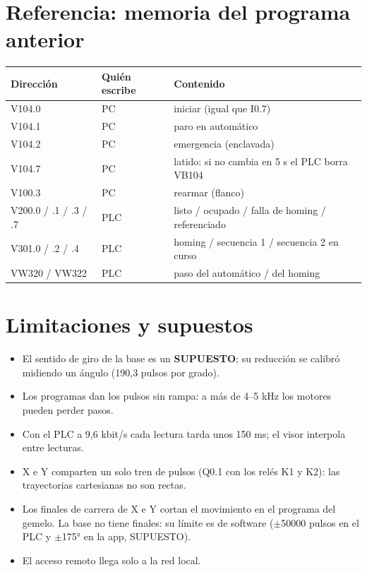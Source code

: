 \documentclass[a4paper,11pt]{article}
\begin{document}
\section{Referencia: memoria del programa anterior}
\begin{center}\small
\begin{tabular}{@{}lll@{}}
\toprule
\textbf{Dirección} & \textbf{Quién escribe} & \textbf{Contenido}\\
\midrule
V104.0 & PC & iniciar (igual que I0.7)\\
V104.1 & PC & paro en automático\\
V104.2 & PC & emergencia (enclavada)\\
V104.7 & PC & latido: si no cambia en 5 s el PLC borra VB104\\
V100.3 & PC & rearmar (flanco)\\
V200.0 / .1 / .3 / .7 & PLC & listo / ocupado / falla de homing / referenciado\\
V301.0 / .2 / .4 & PLC & homing / secuencia 1 / secuencia 2 en curso\\
VW320 / VW322 & PLC & paso del automático / del homing\\
\bottomrule
\end{tabular}
\end{center}

\section{Limitaciones y supuestos}
\begin{itemize}
\item El sentido de giro de la base es un \textbf{SUPUESTO}; su reducción se calibró midiendo un ángulo (190,3 pulsos por grado).
\item Los programas dan los pulsos sin rampa: a más de 4--5 kHz los motores pueden perder pasos.
\item Con el PLC a 9,6 kbit/s cada lectura tarda unos 150 ms; el visor interpola entre lecturas.
\item X e Y comparten un solo tren de pulsos (Q0.1 con los relés K1 y K2): las trayectorias cartesianas no son rectas.
\item Los finales de carrera de X e Y cortan el movimiento en el programa del gemelo. La base no tiene finales: su límite es de software ($\pm$50000 pulsos en el PLC y $\pm$175° en la app, SUPUESTO).
\item El acceso remoto llega solo a la red local.
\end{itemize}
\end{document}
